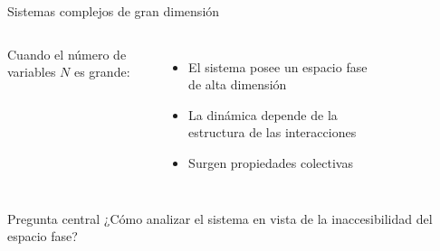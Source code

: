 \documentclass[10pt,aspectratio=169]{beamer}
\theoremstyle{plain}
\theoremstyle{definition}
\begin{document}
\begin{frame}{Sistemas complejos de gran dimensión}
	\begin{columns}
		
			Cuando el número de variables $N$ es grande:
		\begin{itemize}
			\item El sistema posee un espacio fase de alta dimensión
			\item La dinámica depende de la estructura de las interacciones
			\item Surgen propiedades colectivas
		\end{itemize}
		
			\begin{figure}
				\centering
				
			\end{figure}
	\end{columns}

	
	\vspace{0.5cm}
	
	\begin{block}{Pregunta central}
		¿Cómo analizar el sistema en vista de la inaccesibilidad del espacio fase?
	\end{block}
	
\end{frame}
\end{document}
